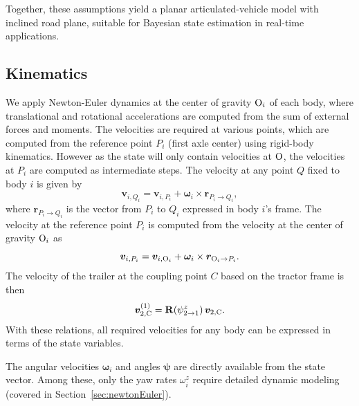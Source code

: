 \documentclass[conference]{IEEEtran}
\begin{document}
Together, these assumptions yield a planar articulated-vehicle model with inclined road plane, suitable for Bayesian state estimation in real-time applications.
\subsection{Kinematics}
We apply Newton-Euler dynamics at the center of gravity $\text{O}_i$ of each body, where translational and rotational accelerations are computed from the sum of external forces and moments. The velocities are required at various points, which are computed from the reference point $P_i$ (first axle center) using rigid-body kinematics. However as the state will only contain velocities at $\text{O}$, the velocities at $P_i$ are computed as intermediate steps. The velocity at any point $Q$ fixed to body $i$ is given by
\begin{equation}
    \bm v_{i,Q_i} = \bm v_{i,P_i} + \bm\omega_i \times \bm r_{P_i\to Q_i},
\end{equation}
where $\bm r_{P_i\to Q_i}$ is the vector from $P_i$ to $Q_i$ expressed in body $i$'s frame. The velocity at the reference point $P_i$ is computed from the velocity at the center of gravity $\text{O}_i$ as
\begin{equation}
    \bm v_{i,P_i} = \bm v_{i,\text{O}_i} + \bm\omega_i \times \bm r_{\text{O}_i\to P_i}.
\end{equation}
The velocity of the trailer at the coupling point $C$ based on the tractor frame is then
\begin{equation}
    \bm v_{2,\text{C}}^{(1)} = \mathbf{R}(\psi^{z}_{2\to 1})\,\bm v_{2,\text{C}}.
\end{equation}
With these relations, all required velocities for any body can be expressed in terms of the state variables. 


The angular velocities $\bm \omega_i$ and angles $\bm \psi$ are directly available from the state vector. Among these, only the yaw rates $\omega^z_i$ require detailed dynamic modeling (covered in Section~\ref{sec:newtonEuler}). 
\end{document}
